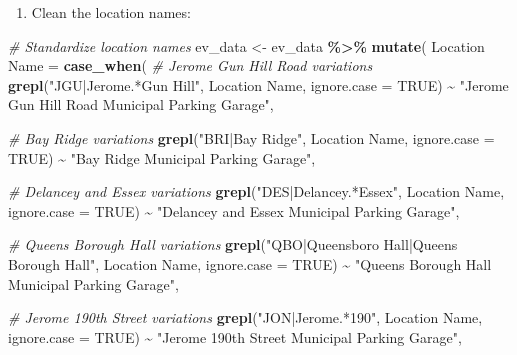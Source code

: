 \documentclass[
  12pt,
]{article}
\newenvironment{Shaded}{\begin{snugshade}}{\end{snugshade}}
\newcommand{\AttributeTok}[1]{\textcolor[rgb]{0.13,0.29,0.53}{#1}}
\newcommand{\CommentTok}[1]{\textcolor[rgb]{0.56,0.35,0.01}{\textit{#1}}}
\newcommand{\ConstantTok}[1]{\textcolor[rgb]{0.56,0.35,0.01}{#1}}
\newcommand{\FunctionTok}[1]{\textcolor[rgb]{0.13,0.29,0.53}{\textbf{#1}}}
\newcommand{\NormalTok}[1]{#1}
\newcommand{\OtherTok}[1]{\textcolor[rgb]{0.56,0.35,0.01}{#1}}
\newcommand{\SpecialCharTok}[1]{\textcolor[rgb]{0.81,0.36,0.00}{\textbf{#1}}}
\newcommand{\StringTok}[1]{\textcolor[rgb]{0.31,0.60,0.02}{#1}}
\providecommand{\tightlist}{%
  \setlength{\itemsep}{0pt}\setlength{\parskip}{0pt}}
\begin{document}
\begin{enumerate}
\def\labelenumi{\arabic{enumi}.}
\setcounter{enumi}{5}
\tightlist
\item
  Clean the location names:
\end{enumerate}

\begin{Shaded}
\begin{Highlighting}[]
\CommentTok{\# Standardize location names}
\NormalTok{ev\_data }\OtherTok{\textless{}{-}}\NormalTok{ ev\_data }\SpecialCharTok{\%\textgreater{}\%}
  \FunctionTok{mutate}\NormalTok{(}
    \StringTok{\textasciigrave{}}\AttributeTok{Location Name}\StringTok{\textasciigrave{}} \OtherTok{=} \FunctionTok{case\_when}\NormalTok{(}
      \CommentTok{\# Jerome Gun Hill Road variations}
      \FunctionTok{grepl}\NormalTok{(}\StringTok{"JGU|Jerome.*Gun Hill"}\NormalTok{, }\StringTok{\textasciigrave{}}\AttributeTok{Location Name}\StringTok{\textasciigrave{}}\NormalTok{, }\AttributeTok{ignore.case =} \ConstantTok{TRUE}\NormalTok{) }\SpecialCharTok{\textasciitilde{}} 
        \StringTok{"Jerome Gun Hill Road Municipal Parking Garage"}\NormalTok{,}
      
      \CommentTok{\# Bay Ridge variations}
      \FunctionTok{grepl}\NormalTok{(}\StringTok{"BRI|Bay Ridge"}\NormalTok{, }\StringTok{\textasciigrave{}}\AttributeTok{Location Name}\StringTok{\textasciigrave{}}\NormalTok{, }\AttributeTok{ignore.case =} \ConstantTok{TRUE}\NormalTok{) }\SpecialCharTok{\textasciitilde{}} 
        \StringTok{"Bay Ridge Municipal Parking Garage"}\NormalTok{,}
      
      \CommentTok{\# Delancey and Essex variations}
      \FunctionTok{grepl}\NormalTok{(}\StringTok{"DES|Delancey.*Essex"}\NormalTok{, }\StringTok{\textasciigrave{}}\AttributeTok{Location Name}\StringTok{\textasciigrave{}}\NormalTok{, }\AttributeTok{ignore.case =} \ConstantTok{TRUE}\NormalTok{) }\SpecialCharTok{\textasciitilde{}} 
        \StringTok{"Delancey and Essex Municipal Parking Garage"}\NormalTok{,}
      
      \CommentTok{\# Queens Borough Hall variations}
      \FunctionTok{grepl}\NormalTok{(}\StringTok{"QBO|Queensboro Hall|Queens Borough Hall"}\NormalTok{, }\StringTok{\textasciigrave{}}\AttributeTok{Location Name}\StringTok{\textasciigrave{}}\NormalTok{, }\AttributeTok{ignore.case =} \ConstantTok{TRUE}\NormalTok{) }\SpecialCharTok{\textasciitilde{}} 
        \StringTok{"Queens Borough Hall Municipal Parking Garage"}\NormalTok{,}
      
      \CommentTok{\# Jerome 190th Street variations}
      \FunctionTok{grepl}\NormalTok{(}\StringTok{"JON|Jerome.*190"}\NormalTok{, }\StringTok{\textasciigrave{}}\AttributeTok{Location Name}\StringTok{\textasciigrave{}}\NormalTok{, }\AttributeTok{ignore.case =} \ConstantTok{TRUE}\NormalTok{) }\SpecialCharTok{\textasciitilde{}} 
        \StringTok{"Jerome 190th Street Municipal Parking Garage"}\NormalTok{,}
      

\end{Highlighting}
\end{Shaded}
\end{document}
